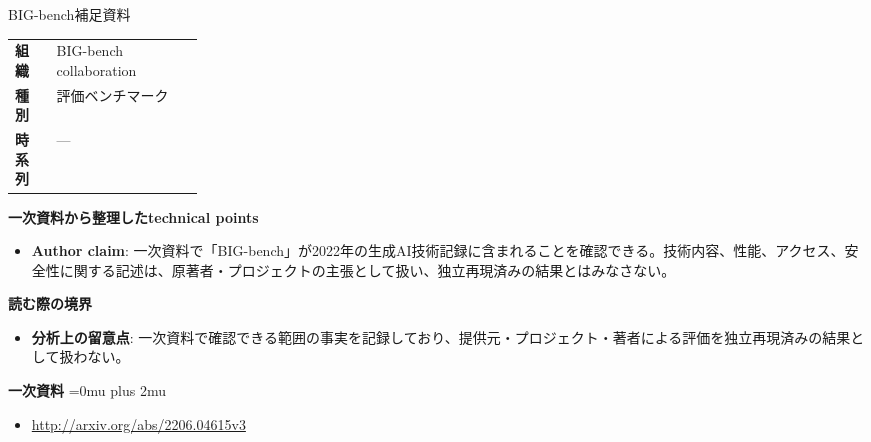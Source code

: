 \begin{technicalnote}{BIG-bench}{補足資料}
\begingroup
\begin{tabularx}{\linewidth}{@{}>{\bfseries}p{0.22\linewidth}X@{}}
組織 & BIG-bench collaboration \\
種別 & 評価ベンチマーク \\
時系列 & — \\
\end{tabularx}
\smallskip
{\bfseries 一次資料から整理したtechnical points}
\begin{itemize}[leftmargin=1.5em,itemsep=0.35em]
\item \textbf{Author claim}: 一次資料で「BIG-bench」が2022年の生成AI技術記録に含まれることを確認できる。技術内容、性能、アクセス、安全性に関する記述は、原著者・プロジェクトの主張として扱い、独立再現済みの結果とはみなさない。
\end{itemize}
\begin{minipage}{\linewidth}
{\bfseries 読む際の境界}
\begin{itemize}[leftmargin=1.5em,itemsep=0.35em]
\item \textbf{分析上の留意点}: 一次資料で確認できる範囲の事実を記録しており、提供元・プロジェクト・著者による評価を独立再現済みの結果として扱わない。
\end{itemize}
\begin{samepage}
{\bfseries 一次資料}
\begingroup\sloppy
\Urlmuskip=0mu plus 2mu\relax
\begin{itemize}[leftmargin=1.5em,itemsep=0.25em]
\item {\scriptsize\url{http://arxiv.org/abs/2206.04615v3}}
\end{itemize}
\endgroup
\end{samepage}
\end{minipage}
\endgroup
\end{technicalnote}
\medskip
